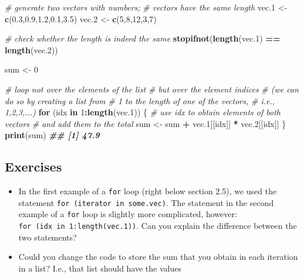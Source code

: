 \documentclass[
]{book}
\newenvironment{Shaded}{\begin{snugshade}}{\end{snugshade}}
\newcommand{\CommentTok}[1]{\textcolor[rgb]{0.56,0.35,0.01}{\textit{#1}}}
\newcommand{\ControlFlowTok}[1]{\textcolor[rgb]{0.13,0.29,0.53}{\textbf{#1}}}
\newcommand{\DecValTok}[1]{\textcolor[rgb]{0.00,0.00,0.81}{#1}}
\newcommand{\DocumentationTok}[1]{\textcolor[rgb]{0.56,0.35,0.01}{\textbf{\textit{#1}}}}
\newcommand{\FloatTok}[1]{\textcolor[rgb]{0.00,0.00,0.81}{#1}}
\newcommand{\FunctionTok}[1]{\textcolor[rgb]{0.13,0.29,0.53}{\textbf{#1}}}
\newcommand{\NormalTok}[1]{#1}
\newcommand{\OtherTok}[1]{\textcolor[rgb]{0.56,0.35,0.01}{#1}}
\newcommand{\SpecialCharTok}[1]{\textcolor[rgb]{0.81,0.36,0.00}{\textbf{#1}}}
\providecommand{\tightlist}{%
  \setlength{\itemsep}{0pt}\setlength{\parskip}{0pt}}
\begin{document}
\begin{Shaded}
\begin{Highlighting}[]
\CommentTok{\# generate two vectors with numbers; }
\CommentTok{\# vectors have the same length}
\NormalTok{vec.1 }\OtherTok{\textless{}{-}} \FunctionTok{c}\NormalTok{(}\FloatTok{0.3}\NormalTok{,}\FloatTok{0.9}\NormalTok{,}\FloatTok{1.2}\NormalTok{,}\FloatTok{0.1}\NormalTok{,}\FloatTok{3.5}\NormalTok{)}
\NormalTok{vec.2 }\OtherTok{\textless{}{-}} \FunctionTok{c}\NormalTok{(}\DecValTok{5}\NormalTok{,}\DecValTok{8}\NormalTok{,}\DecValTok{12}\NormalTok{,}\DecValTok{3}\NormalTok{,}\DecValTok{7}\NormalTok{)}

\CommentTok{\# check whether the length is indeed the same}
\FunctionTok{stopifnot}\NormalTok{(}\FunctionTok{length}\NormalTok{(vec.1) }\SpecialCharTok{==} \FunctionTok{length}\NormalTok{(vec.2))}

\NormalTok{sum }\OtherTok{\textless{}{-}} \DecValTok{0}

\CommentTok{\# loop not over the elements of the list}
\CommentTok{\# but over the element indices}
\CommentTok{\# (we can do so by creating a list from }
\CommentTok{\# 1 to the length of one of the vectors,}
\CommentTok{\# i.e., 1,2,3,...)}
\ControlFlowTok{for}\NormalTok{ (idx }\ControlFlowTok{in} \DecValTok{1}\SpecialCharTok{:}\FunctionTok{length}\NormalTok{(vec.1))}
\NormalTok{\{}
    \CommentTok{\# use idx to obtain elements of both vectors}
    \CommentTok{\# and add them to the total}
\NormalTok{    sum }\OtherTok{\textless{}{-}}\NormalTok{ sum }\SpecialCharTok{+} 
\NormalTok{        vec.1[[idx]] }\SpecialCharTok{*}\NormalTok{ vec.2[[idx]]}
\NormalTok{\}}
\FunctionTok{print}\NormalTok{(sum)}
\DocumentationTok{\#\# [1] 47.9}
\end{Highlighting}
\end{Shaded}

\subsection{Exercises}\label{exercises-1}

\begin{itemize}
\tightlist
\item
  In the first example of a \texttt{for} loop (right below section 2.5), we used the statement \texttt{for\ (iterator\ in\ some.vec)}. The statement in the second example of a \texttt{for} loop is slightly more complicated, however: \texttt{for\ (idx\ in\ 1:length(vec.1))}. Can you explain the difference between the two statements?
\item
  Could you change the code to store the sum that you obtain in each iteration in a list?
  I.e., that list should have the values
\end{itemize}
\end{document}

